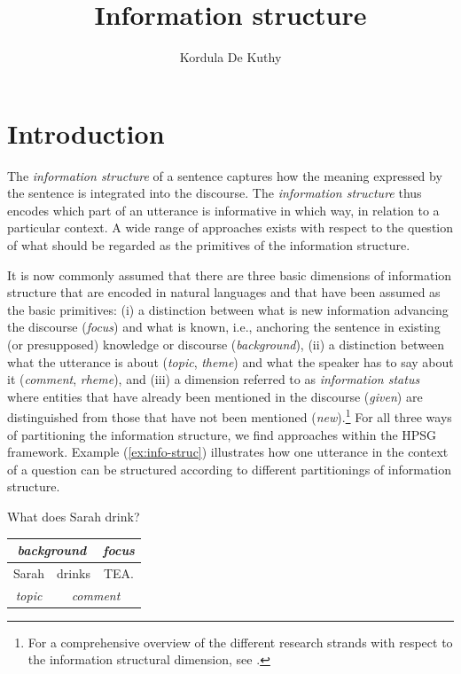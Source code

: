 \documentclass[output=paper]{langsci/langscibook}
\author{Kordula De Kuthy\affiliation{Universität Tübingen}}
\title{Information structure}
\begin{document}
\label{chap-information-structure}



\section{Introduction} 


The \textit{information structure} of a sentence captures how the meaning
expressed by the sentence is integrated into the discourse.
The \textit{information structure} thus encodes which part of an
  utterance is informative in which way, in relation to a particular context.
A wide range of approaches exists with respect to the question of what
should be regarded as the primitives of the information structure.

It is now commonly assumed that there are three basic dimensions of
information structure that are encoded in natural languages and that
have been assumed as the basic primitives: (i) a distinction between
what is new information advancing the discourse (\emph{focus}) and
what is known, i.e., anchoring the sentence in existing (or
presupposed) knowledge or discourse (\emph{background}), (ii) a
distinction between what the utterance is about (\emph{topic},
\emph{theme}) and what the speaker has to say about it
(\emph{comment}, \emph{rheme}), and (iii) a dimension referred to as
\textit{information status} where entities that have already been
mentioned in the discourse (\textit{given}) are distinguished from
those that have not been mentioned (\emph{new}).\footnote{For a comprehensive overview of the different research strands with respect to the information structural dimension, see \citet{KruijffSteedman2003}.} For all three ways of
partitioning the information structure, we find approaches within the
HPSG framework.  Example (\ref{ex:info-struc}) illustrates how one
utterance in the context of a question can be structured according to
different partitionings of information structure.
\begin{exe}
\ex\label{ex:info-struc}
\begin{xlist}
  What does Sarah drink?
  \begin{tabular}[c]{|c|c|c|}
\multicolumn{2}{c|}{\small\textsl{background}} & \multicolumn{1}{c}{\small\textsl{focus}}\\\hline 
Sarah & drinks & TEA.\\\hline
\multicolumn{1}{c|}{\small\textsl{topic}} & \multicolumn{2}{c}{\small\textsl{comment}}\\
  \end{tabular}
\end{xlist}

\end{exe}
\end{document}
